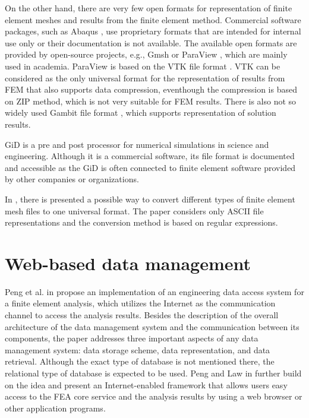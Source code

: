

On the other hand, there are very few open formats for representation of finite element meshes and results from the finite element method. Commercial software packages, such as Abaqus \cite{Abaqus}, use proprietary formats that are intended for internal use only or their documentation is not available. The available open formats are provided by open-source projects, e.g., Gmsh \cite{Geuzaine2009} or ParaView \cite{ParaView2005}, which are mainly used in academia. ParaView is based on the VTK file format \cite{VTK2015}. VTK can be considered as the only universal format for the representation of results from FEM that also supports data compression, eventhough the compression is based on ZIP method, which is not very suitable for FEM results. There is also not so widely used Gambit file format \cite{GAMBIT}, which supports representation of solution results.

GiD \cite{GiDWeb} is a pre and post processor for numerical simulations in science and engineering. Although it is a commercial software, its file format is documented \cite{GiDPostProcess} and accessible as the GiD is often connected to finite element software provided by other companies or organizations.

In \cite{Ivanyi2012}, there is presented a possible way to convert different types of finite element mesh files to one universal format. The paper considers only ASCII file representations and the conversion method is based on regular expressions.


\section{Web-based data management}

Peng et al. in \cite{Peng2003} propose an implementation of an engineering data access system for a finite element analysis, which utilizes the Internet as the communication channel to access the analysis results. Besides the description of the overall architecture of the data management system and the communication between its components, the paper addresses three important aspects of any data management system: data storage scheme, data representation, and data retrieval. Although the exact type of database is not mentioned there, the relational type of database is expected to be used. Peng and Law in \cite{Peng2004} further build on the idea and present an Internet-enabled framework that allows users easy access to the FEA core service and the analysis results by using a web browser or other application programs.

